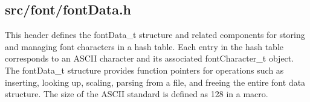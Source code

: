 \subsection{src/font/fontData.h}
This header defines the fontData\_t structure and related components for storing and managing font characters in a hash table. Each entry in the hash table corresponds to an ASCII character and its associated fontCharacter\_t object. The fontData\_t structure provides function pointers for operations such as inserting, looking up, scaling, parsing from a file, and freeing the entire font data structure. The size of the ASCII standard is defined as 128 in a macro.